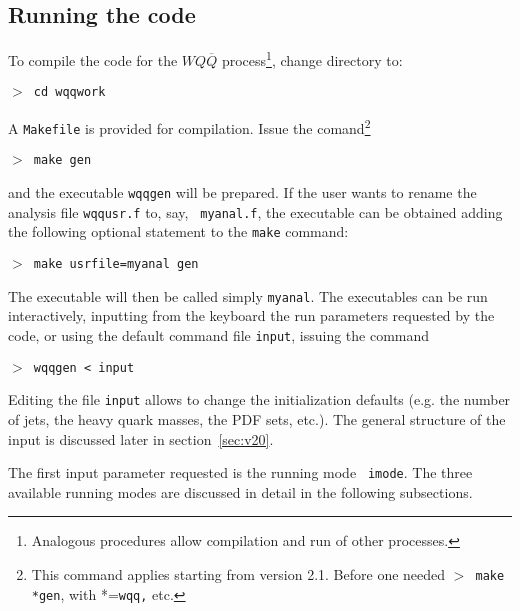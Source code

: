 \documentclass[paper]{JHEP3}
\def    \Qbar   {\overline{Q}}
\begin{document}
\begin{appendix}
\section{Running the code}
To compile the code for the $WQ\Qbar$ process\footnote{Analogous
  procedures allow compilation and run of other processes.}, change
directory to:

{\tt $>$ cd wqqwork}

A {\tt Makefile} is provided for compilation. Issue the
comand\footnote{This command applies starting from version 2.1. Before
  one needed {\tt $>$ make *gen}, with *={\tt wqq,} etc.}

{\tt $>$ make gen}

and the executable {\tt wqqgen} will be prepared.  If the user
  wants to rename the analysis file {\tt wqqusr.f} to, say, {\tt
    myanal.f}, the executable can be obtained adding the following
  optional statement to the {\tt make} command:

{\tt $>$ make usrfile=myanal gen}

The executable will then be called simply  {\tt myanal}. 
The executables can be run
interactively, inputting from the keyboard the run parameters
requested by the code, or using
the default command file {\tt input}, issuing the command 

{\tt $>$ wqqgen < input}

Editing the file {\tt input} allows to change the initialization
defaults (e.g. the number of jets, the heavy quark masses, the PDF
sets, etc.). The general structure of the input is discussed later in
section~\ref{sec:v20}. 

The first input parameter requested is the running mode {\tt
  imode}. The three available running modes are discussed in detail in
the following subsections. 




\end{appendix}
\end{document}
